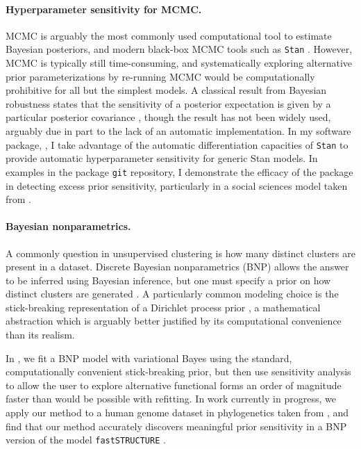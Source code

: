 \paragraph{Hyperparameter sensitivity for MCMC.}

MCMC is arguably the most commonly used computational tool to estimate Bayesian
posteriors, and modern black-box MCMC tools such as \texttt{Stan} \citep{rstan,
carpenter:2017:stan}.  However, MCMC is typically still time-consuming, and
systematically exploring alternative prior parameterizations by re-running MCMC
would be computationally prohibitive for all but the simplest models. A
classical result from Bayesian robustness states that the sensitivity of a
posterior expectation is given by a particular posterior covariance
\citep{gustafson:1996:localposterior, basu:1996:local}, though the result has
not been widely used, arguably due in part to the lack of an automatic
implementation. In my software package, \citet{giordano:2020:rstansensitivity},
I take advantage of the automatic differentiation capacities of \texttt{Stan} to
provide automatic hyperparameter sensitivity for generic Stan models.  In
examples in the package \texttt{git} repository, I demonstrate the efficacy of
the package in detecting excess prior sensitivity, particularly in a social
sciences model taken from \citet[Chapter 13.5]{gelman:2006:arm}.


\paragraph{Bayesian nonparametrics.}

A commonly question in unsupervised clustering is how many distinct clusters are
present in a dataset.  Discrete Bayesian nonparametrics (BNP) allows the answer
to be inferred using Bayesian inference, but one must specify a prior on how
distinct clusters are generated \citep{ghosh:2003:bnp,
gershman:2012:bnptutorial}.  A particularly common modeling choice is the
stick-breaking representation of a Dirichlet process prior
\citep{sethuraman:1994:constructivedp}, a mathematical abstraction which is
arguably better justified by its computational convenience than its realism.

In \citet{giordano:2018:bnpsensitivity}, we fit a BNP model with variational
Bayes \citep{blei:2006:dirichletbnp} using the standard, computationally
convenient stick-breaking prior, but then use sensitivity analysis to allow the
user to explore alternative functional forms an order of magnitude faster than
would be possible with refitting. In work currently in progress, we apply our
method to a human genome dataset in phylogenetics taken from
\citep{huang:2011:haplotype}, and find that our method accurately discovers
meaningful prior sensitivity in a BNP version of the model
\texttt{fastSTRUCTURE} \citep{raj:2014:faststructure}.


